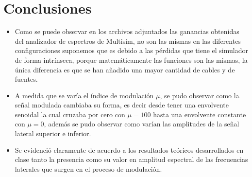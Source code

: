 \documentclass[12pt,graphicx,caption,rotating]{article}
\begin{document}
\section*{Conclusiones}
\begin{itemize}
 \item Como se puede observar en los archivos adjuntados las ganancias obtenidas del analizador de espectros de Multisim, no son las mismas en las diferentes configuraciones suponemos que es debido a las pérdidas que tiene el simulador de forma intrínseca, porque matemáticamente las funciones son las mismas, la única diferencia es que se han añadido una mayor cantidad de cables y de fuentes.
 
 \item A medida que se varía el índice de modulación $\mu$, se pudo observar como la señal modulada cambiaba su forma, es decir desde tener una envolvente senoidal la cual cruzaba por cero con $\mu=100$ hasta una envolvente constante con $\mu=0$, además se pudo observar como varían las amplitudes de la señal lateral superior e inferior.
 
 \item Se evidenció claramente de acuerdo a los resultados  teóricos desarrollados en clase tanto la presencia como su valor en amplitud espectral de las frecuencias laterales que surgen en el proceso de modulación.
\end{itemize}
\end{document}
